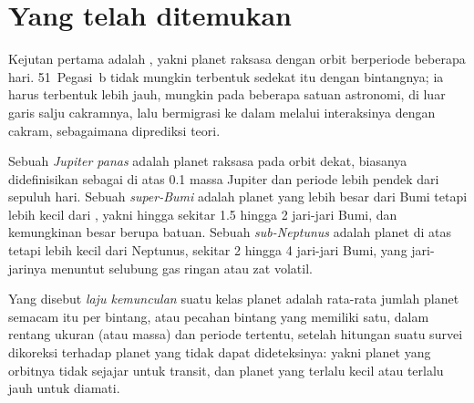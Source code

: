 
\section{Yang telah ditemukan}\label{sec:b3:exoplanets:found}

Kejutan pertama adalah , yakni planet raksasa dengan orbit
berperiode beberapa hari. 51~Pegasi~b tidak mungkin terbentuk sedekat itu dengan bintangnya; ia harus
terbentuk lebih jauh, mungkin pada beberapa satuan astronomi, di luar garis salju
cakramnya, lalu bermigrasi ke dalam melalui interaksinya dengan
cakram, sebagaimana diprediksi teori.

\begin{definition}\label{def:b3:exoplanets:classes}
Sebuah \emph{Jupiter panas} adalah planet raksasa pada orbit dekat,
biasanya didefinisikan sebagai  di atas 0.1 massa Jupiter dan periode
lebih pendek dari sepuluh hari. Sebuah \emph{super-Bumi} adalah planet
yang lebih besar dari Bumi tetapi lebih kecil dari , yakni hingga
sekitar 1.5 hingga 2 jari-jari Bumi, dan kemungkinan besar berupa batuan. Sebuah \emph{sub-Neptunus}
adalah planet di atas  tetapi lebih kecil dari Neptunus, sekitar 2 hingga
4 jari-jari Bumi, yang jari-jarinya menuntut selubung gas ringan atau
zat volatil.
\end{definition}

\begin{definition}\label{def:b3:exoplanets:occurrence}
Yang disebut \emph{laju kemunculan} suatu kelas planet adalah
rata-rata jumlah planet semacam itu per bintang, atau pecahan bintang yang
memiliki satu, dalam rentang ukuran (atau massa) dan periode tertentu, setelah
hitungan suatu survei dikoreksi terhadap planet yang tidak dapat dideteksinya:
yakni planet yang orbitnya tidak sejajar untuk transit, dan planet yang terlalu kecil atau
terlalu jauh untuk diamati.
\end{definition}

